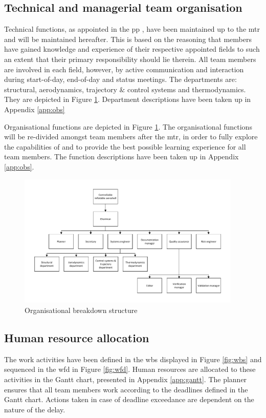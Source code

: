 \subsection{Technical and managerial team organisation}
\label{sec:org}
Technical functions, as appointed in the \acrfull{pp} \cite{Balasooriyan2015}, have been maintained up to the \gls{mtr} and will be maintained hereafter. This is based on the reasoning that members have gained knowledge and experience of their respective appointed fields to such an extent that their primary responsibility should lie therein. All team members are involved in each field, however, by active communication and interaction during start-of-day, end-of-day and status meetings. The departments are: structural, aerodynamics, trajectory $\&$ control systems and thermodynamics. They are depicted in Figure  \ref{fig:obs}. Department descriptions have been taken up in Appendix \ref{app:obs}

Organisational functions are depicted in Figure  \ref{fig:obs}. The organisational functions will be re-divided amongst team members after the \gls{mtr}, in order to fully explore the capabilities of and to provide the best possible learning experience for all team members. The function descriptions have been taken up in Appendix \ref{app:obs}.

\begin{figure}[H]
\centering
\includegraphics[width=0.95\textwidth]{./Figure/OBS_MTR.pdf}
\caption{Organisational breakdown structure} \label{fig:OBS}
\label{fig:obs}
\end{figure}

\subsection{Human resource allocation}
\label{sec:gantt}
The work activities have been defined in the \gls{wbs} displayed in Figure  \ref{fig:wbs} and sequenced in the \gls{wfd} in Figure  \ref{fig:wfd}. Human resources are allocated to these activities in the Gantt chart, presented in Appendix \ref{app:gantt}. The planner ensures that all team members work according to the deadlines defined in the Gantt chart. Actions taken in case of deadline exceedance are dependent on the nature of the delay.



